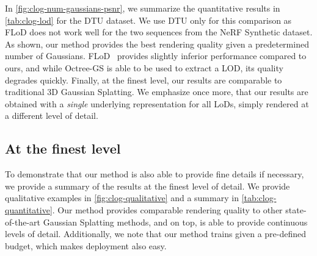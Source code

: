     In \cref{fig:clog-num-gaussians-psnr}, we summarize the quantitative
    results in \cref{tab:clog-lod} for the DTU dataset.
    We use DTU only for this comparison as FLoD does not work well for the two
    sequences from the NeRF Synthetic dataset.
    As shown, our method provides the best rendering quality given a
    predetermined number of Gaussians.
    FLoD~\cite{seo2024flod} provides slightly inferior performance compared to
    ours, and while Octree-GS is able to be used to extract a LOD, its quality
    degrades quickly.
    Finally, at the finest level, our results are comparable to traditional 3D
    Gaussian Splatting.
    We emphasize once more, that our results are obtained with a \emph{single}
    underlying representation for all LoDs, simply rendered at a different
    level of detail.



  \subsection{At the finest level}
    To demonstrate that our method is also able to provide fine details if
    necessary, we provide a summary of the results at the finest level of
    detail.
    We provide qualitative examples in \cref{fig:clog-qualitative} and a
    summary in \cref{tab:clog-quantitative}.
    Our method provides comparable rendering quality to other state-of-the-art
    Gaussian Splatting methods, and on top, is able to provide continuous
    levels of detail.
    Additionally, we note that our method trains given a pre-defined budget,
    which makes deployment also easy.


